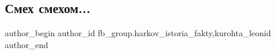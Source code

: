  
 
 
 
 
 
\subsection{Смех смехом...}
\label{sec:28_04_2022.fb.fb_group.harkov_istoria_fakty.1.smeh_smehom}
 
\ifcmt
 author_begin
   author_id fb_group.harkov_istoria_fakty,kurohta_leonid
 author_end
\fi

